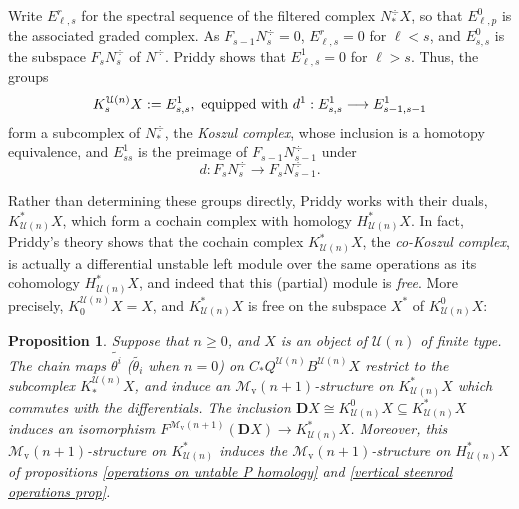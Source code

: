 \documentclass[11pt]{amsart} \renewcommand{\baselinestretch}{1.2}
\theoremstyle{plain}
\newtheorem{prop}[thm]{Proposition}
\numberwithin{equation}{section} %
\theoremstyle{plain}
\newtheorem{prop}[thm]{Proposition}
\numberwithin{equation}{chapter} %
\renewcommand{\to}{\longrightarrow}
\newcommand{\calU}{\mathcal{U}}
\newcommand{\calMv}{\mathcal{M}\dver}
\newcommand{\Nop}{N^{\smash{-}}}
\newcommand{\dver}{_\mathrm{v}}
\newcommand{\dual}{\mathbf{D}}
\begin{document}
\begin{Koszul complexes}
Write $E^r_{\ell,s}$ for the spectral sequence of the filtered complex $N^\div_*X$, so that $E^0_{\ell,p}$ is the associated graded complex. As $F_{s-1} N^\div_s=0$, $E^r_{\ell,s}=0$ for $\ell<s$, and $E^0_{s,s}$ is the subspace $F_sN^\div_s$ of $N^\div$. %
Priddy \cite[Proof of Theorem 5.3]{PriddyKoszul.pdf} shows that $E^1_{\ell,s}=0$  for $\ell>s$. Thus, the groups
\[K_s^{\calU(n)}X:=E^1_{s,s}, \textup{ equipped with $d^1:E^1_{s,s}\to E^1_{s-1,s-1}$}\]
form a subcomplex of $N^\div_*$, the \emph{Koszul complex}, whose inclusion is a homotopy equivalence, and $E^1_{ss}$ is the preimage of $F_{s-1}N^\div_{s-1}$ under
\[d:F_{s}N^\div_{s}\to F_{s}N^\div_{s-1}.\]


Rather than determining these groups directly, Priddy works with their duals, $K^*_{\calU(n)}X$, which form a cochain complex with homology $H^*_{\calU(n)}X$. In fact, Priddy's theory shows that the cochain complex $K^*_{\calU(n)}X$, the \emph{co-Koszul complex}, is actually a differential unstable left module over the same operations as its cohomology $H^*_{\calU(n)}X$, and indeed that this (partial) module is \emph{free}. More precisely,  $K_0^{\calU(n)}X= X$, and $K^*_{\calU(n)}X$ is free on the  subspace $X^*$ of $K^0_{\calU(n)}X$:
\begin{prop}
\label{the cokoszul complex is free}
Suppose that $n\geq0$, and $X$ is an object of $\calU(n)$ of finite type. The chain maps $\widetilde{\theta^i}$  ($\widetilde{\theta_i}$ when $n=0$) on $C_*Q^{\calU(n)}B^{\calU(n)}X$ restrict to the subcomplex $K_*^{\calU(n)}X$, and induce an $\calMv(n+1)$-structure on $K^*_{\calU(n)}X$ which commutes with the differentials. The inclusion $\dual X\cong K^0_{\calU(n)}X\subseteq K^*_{\calU(n)}X$ induces an isomorphism $F^{\calMv(n+1)}(\dual X)\to K^*_{\calU(n)}X$. Moreover, this $\calMv(n+1)$-structure on $K^*_{\calU(n)}$ induces the $\calMv(n+1)$-structure on $H^*_{\calU(n)}X$ of propositions \ref{operations on untable P homology} and \ref{vertical steenrod operations prop}.
\end{prop}



\end{Koszul complexes}
\end{document}
